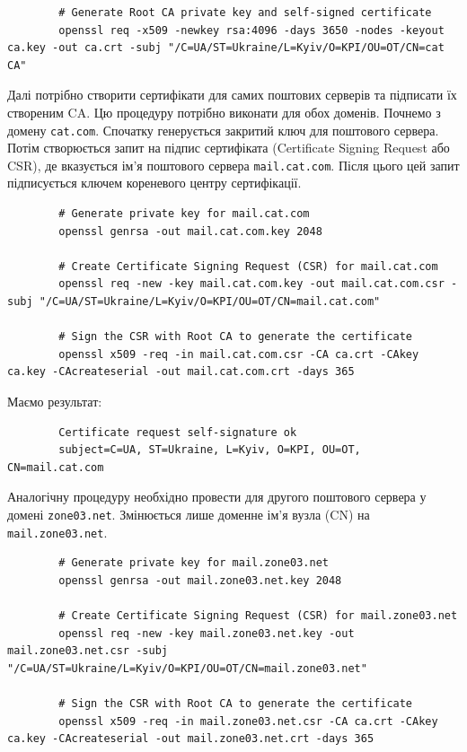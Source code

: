 \documentclass[14pt, a4paper]{extreport}
\begin{document}
	\begin{verbatim}
		# Generate Root CA private key and self-signed certificate
		openssl req -x509 -newkey rsa:4096 -days 3650 -nodes -keyout ca.key -out ca.crt -subj "/C=UA/ST=Ukraine/L=Kyiv/O=KPI/OU=OT/CN=cat CA"
	\end{verbatim}
	
	Далі потрібно створити сертифікати для самих поштових серверів та підписати їх створеним CA. Цю процедуру потрібно виконати для обох доменів. Почнемо з домену \texttt{cat.com}. Спочатку генерується закритий ключ для поштового сервера. Потім створюється запит на підпис сертифіката (Certificate Signing Request або CSR), де вказується ім'я поштового сервера \texttt{mail.cat.com}. Після цього цей запит підписується ключем кореневого центру сертифікації.
	
	\begin{verbatim}
		# Generate private key for mail.cat.com
		openssl genrsa -out mail.cat.com.key 2048
		
		# Create Certificate Signing Request (CSR) for mail.cat.com
		openssl req -new -key mail.cat.com.key -out mail.cat.com.csr -subj "/C=UA/ST=Ukraine/L=Kyiv/O=KPI/OU=OT/CN=mail.cat.com"
		
		# Sign the CSR with Root CA to generate the certificate
		openssl x509 -req -in mail.cat.com.csr -CA ca.crt -CAkey ca.key -CAcreateserial -out mail.cat.com.crt -days 365
	\end{verbatim}
	
	Маємо результат:
	
	\begin{verbatim}
		Certificate request self-signature ok
		subject=C=UA, ST=Ukraine, L=Kyiv, O=KPI, OU=OT, CN=mail.cat.com
	\end{verbatim}
	
	Аналогічну процедуру необхідно провести для другого поштового сервера у домені \texttt{zone03.net}. Змінюється лише доменне ім'я вузла (CN) на \texttt{mail.zone03.net}.
	
	\begin{verbatim}
		# Generate private key for mail.zone03.net
		openssl genrsa -out mail.zone03.net.key 2048
		
		# Create Certificate Signing Request (CSR) for mail.zone03.net
		openssl req -new -key mail.zone03.net.key -out mail.zone03.net.csr -subj "/C=UA/ST=Ukraine/L=Kyiv/O=KPI/OU=OT/CN=mail.zone03.net"
		
		# Sign the CSR with Root CA to generate the certificate
		openssl x509 -req -in mail.zone03.net.csr -CA ca.crt -CAkey ca.key -CAcreateserial -out mail.zone03.net.crt -days 365
	\end{verbatim}
	
\end{document}
